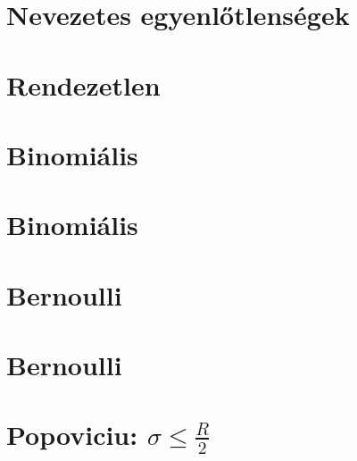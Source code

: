 


\begin{spacing}{1.4}
\pagecolor{BGSZ}

\section*{Nevezetes egyenlőtlenségek} \label{DB}
\newpage
\section*{Rendezetlen} \label{DBuno}
\newline
{}
\newline
{}
\newline
{}
\newline
{}
\vspace{0.5cm}
\newpage
\section*{Binomiális} \label{DBuno1}
\Fa{

}
\vspace{0.5cm}
\newpage
\section*{Binomiális} \label{DBuno1Mo}
\Mo{

}
\vspace{0.5cm}
\newpage
\section*{Bernoulli} \label{DBuno2}
\Fa{

}
\vspace{0.5cm}
\newpage
\section*{Bernoulli} \label{DBuno2Mo}
\Mo{

}
\vspace{0.5cm}
\newpage
\section*{Popoviciu: $\sigma\le\frac{R}{2}$} \label{DBuno3}
\Fa{

}
\vspace{0.5cm}
\newpage

\end{spacing}
